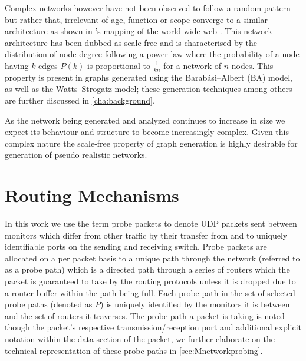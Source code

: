 Complex networks however have not been observed to follow a random pattern but rather that, irrelevant of age, function or scope converge to a similar architecture as shown in \cite{albert_diameter_1999}’s mapping of the world wide web . This network architecture has been dubbed as scale-free and is characterised by the distribution of node degree following a power-law where the probability of a node having $k$ edges $P(k)$  is proportional to $\frac{1}{kn}$ for a network of $n$ nodes. This property is present in graphs generated using the Barabási–Albert (BA) model, as well as the Watts–Strogatz model; these generation techniques among others are further discussed in \cref{cha:background}.\par
As the network being generated and analyzed continues to increase in size we expect its behaviour and structure to become increasingly complex. Given this complex nature the scale-free property of graph generation is highly desirable for generation of pseudo realistic networks.

\section{Routing Mechanisms}
\label{sec:Broutingmechanisms}

    In this work we use the term probe packets to denote UDP packets sent between monitors which differ from other traffic by their transfer from and to uniquely identifiable ports on the sending and receiving switch. Probe packets are allocated on a per packet basis to a unique path through the network (referred to as a probe path) which is a directed path through a series of routers which the packet is guaranteed to take by the routing protocols unless it is dropped due to a router buffer within the path being full. Each probe path in the set of selected probe paths (denoted as $P$) is uniquely identified by the monitors it is between and the set of routers it traverses. The probe path a packet is taking is noted though the packet's respective transmission/reception port and additional explicit notation within the data section of the packet, we further elaborate on the technical representation of these probe paths in \cref{sec:Mnetworkprobing}.\par
    
